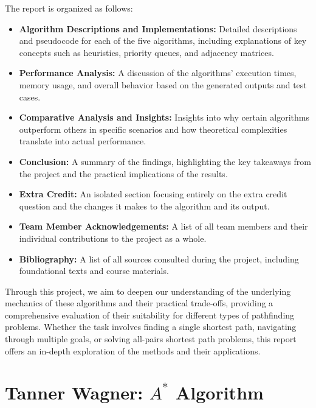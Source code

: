\documentclass[12pt]{article}
\begin{document}
\noindent The report is organized as follows:
\begin{itemize}
    \item \textbf{Algorithm Descriptions and Implementations:} Detailed descriptions and pseudocode for each of the five algorithms, including explanations of key concepts such as heuristics, priority queues, and adjacency matrices.
    \item \textbf{Performance Analysis:} A discussion of the algorithms' execution times, memory usage, and overall behavior based on the generated outputs and test cases.
    \item \textbf{Comparative Analysis and Insights:} Insights into why certain algorithms outperform others in specific scenarios and how theoretical complexities translate into actual performance.
    \item \textbf{Conclusion:} A summary of the findings, highlighting the key takeaways from the project and the practical implications of the results.
    \item \textbf{Extra Credit:} An isolated section focusing entirely on the extra credit question and the changes it makes to the algorithm and its output.
    \item \textbf{Team Member Acknowledgements:} A list of all team members and their individual contributions to the project as a whole.
    \item \textbf{Bibliography:} A list of all sources consulted during the project, including foundational texts and course materials.
\end{itemize}

\noindent Through this project, we aim to deepen our understanding of the underlying mechanics of these algorithms and their practical trade-offs, providing a comprehensive evaluation of their suitability for different types of pathfinding problems. Whether the task involves finding a single shortest path, navigating through multiple goals, or solving all-pairs shortest path problems, this report offers an in-depth exploration of the methods and their applications.
\newpage














\section{Tanner Wagner: $A^*$ Algorithm}
\end{document}
